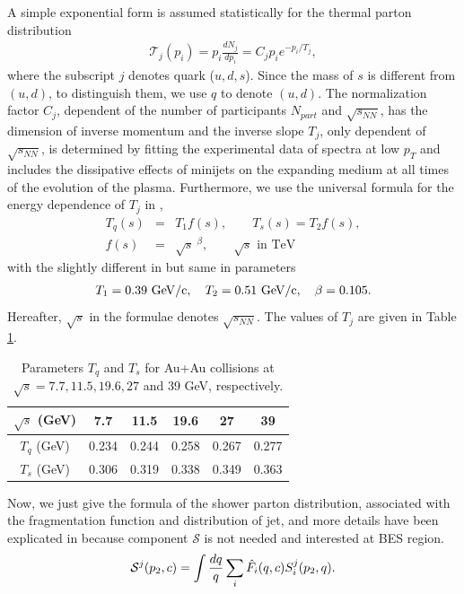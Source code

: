 \documentclass[twocolumn,aps,superscriptaddress,showpacs,nofootinbib,floatfix]{revtex4}
\def\eq{{\,=\,}}
\def\bq{\begin{eqnarray}}
\def\eq{\end{eqnarray}}
\begin{document}
A simple exponential form is assumed statistically for the thermal parton distribution
\begin{eqnarray}
\mathcal T_j(p_i)=p_i\frac{dN_j}{dp_i}=C_jp_ie^{-p_i/T_j},
\label{2.5}
\end{eqnarray}
where the subscript $j$ denotes quark ($u, d, s$). Since the mass of $s$ is different from $(u, d)$, to distinguish them, we use $q$ to denote $(u, d)$. The normalization factor $C_j$, dependent of the number of participants $N_{part}$ and $\sqrt{s_{NN}}$, has the dimension of inverse momentum and the inverse slope $T_j$, only dependent of $\sqrt{s_{NN}}$, is determined by fitting the experimental data of spectra at low $p_T$\cite{3c} and includes the dissipative effects of minijets on the expanding medium at all times of the evolution of the plasma\cite{4u}. Furthermore, we use the universal formula for the energy dependence of $T_j$ in \cite{4u},
\bq
T_q(s)&=&T_1 f(s), \qquad  T_s(s)=T_2 f(s),    \label{2.6}  \\
f(s)&=&{\sqrt s}\ ^\beta, \qquad  {\sqrt s} \text{ in TeV}
\label{2.7}
\eq
with the slightly different in \cite{4u} but same in \cite{2u} parameters
\bq
T_1=0.39\ {\rm GeV/c}, \quad T_2=0.51\ {\rm GeV/c}, \quad \beta=0.105.  \label{2.8}
\eq
Hereafter, $\sqrt{s}$ in the formulae denotes $\sqrt{s_{NN}}$. The values of $T_j$ are given in Table \ref{tab1}. 
\begin{table}
\begin{tabular}{cccccc}
\hline
\hline
 $\sqrt{s}$ (GeV) &7.7 &11.5 &19.6 &27 &39\\ 
 \hline
$T_q$ (GeV) & 0.234 & 0.244 &0.258 &0.267 &0.277\\
$T_s$ (GeV) &0.306 &0.319 &0.338 &0.349 &0.363\\
 \hline
  \hline
 \end{tabular}
 \caption{Parameters $T_q$ and $T_s$ for Au+Au collisions at $\sqrt{s}=7.7, 11.5, 19.6, 27$ and 39 GeV, respectively.} 
 \label{tab1}
 \end{table} 

Now, we just give the formula of the shower parton distribution, associated with the fragmentation function and distribution of jet, and more details have been explicated in \cite{2u} because component $\mathcal{S}$ is not needed and interested at BES region.
\begin{eqnarray}
{\cal S}^j(p_{2}, c)=\int {dq\over q}\sum_i \hat F_i(q, c) S_i^j(p_2, q).  \label{2.9}
\end{eqnarray}
\end{document}
